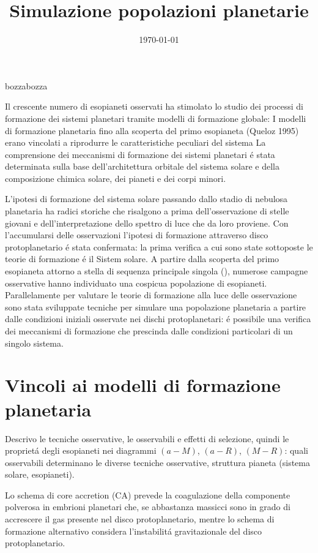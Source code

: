 \documentclass[twoside,11pt,fleqn]{memoir}%
\author{ }
\title{Simulazione popolazioni planetarie}
\date{\today}
\def\versione{bozza}%
\def\bozza{bozza}
\begin{document}
\maketitle
{}
\ifx\versione\bozza
\reworkingc
\fi
\tableofcontents*
\mainmatter
{}
\cleartorecto

\begin{errata}
Il crescente numero di esopianeti osservati ha stimolato lo studio dei processi di formazione dei sistemi planetari tramite modelli di formazione globale: 
I modelli di formazione planetaria fino alla scoperta del primo esopianeta (Queloz 1995) erano vincolati a riprodurre le caratteristiche peculiari del sistema
La comprensione dei meccanismi di formazione dei sistemi planetari \'e stata determinata sulla base dell'architettura orbitale del sistema solare e della composizione chimica solare, dei pianeti e dei corpi minori.
\end{errata}

L'ipotesi di formazione del sistema solare passando dallo stadio di nebulosa planetaria ha radici storiche che risalgono a prima dell'osservazione di stelle giovani e dell'interpretazione dello spettro di luce che da loro proviene. Con l'accumularsi delle osservazioni l'ipotesi di formazione attraverso disco protoplanetario \'e stata confermata: la prima verifica a cui sono state sottoposte le teorie di formazione \'e il Sistem solare.
A partire dalla scoperta del primo esopianeta attorno a stella di sequenza principale singola (\cite{mayor1995jupiter}), numerose campagne osservative hanno individuato una cospicua popolazione di esopianeti. Parallelamente per valutare le teorie di formazione alla luce delle osservazione sono stata sviluppate tecniche per simulare una popolazione planetaria a partire dalle condizioni iniziali osservate nei dischi protoplanetari: \'e possibile una verifica dei meccanismi di formazione che prescinda dalle condizioni particolari di un singolo sistema.

{\let\clearpage\relax\let\cleardoublepage\relax
\part{Vincoli ai modelli di formazione planetaria}
}
\begin{errata}
Descrivo le tecniche osservative, le osservabili e effetti di selezione, quindi le propriet\'a degli esopianeti nei diagrammi $(a-M)$, $(a-R)$, $(M-R)$: quali osservabili determinano le diverse tecniche osservative, struttura pianeta (sistema solare, esopianeti).
\end{errata}
Lo schema di core accretion (CA) prevede la coagulazione della componente polverosa in embrioni planetari che, se abbastanza massicci sono in grado di accrescere il gas presente nel disco protoplanetario, mentre lo schema di formazione alternativo considera l'instabilit\'a gravitazionale del disco protoplanetario.
\end{document}
